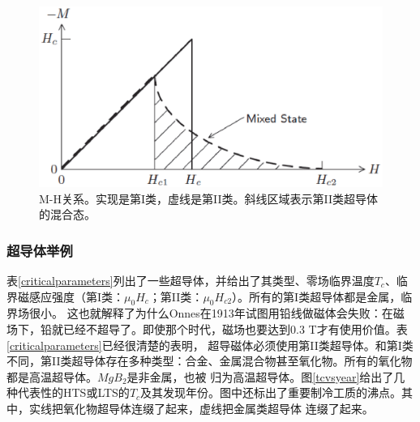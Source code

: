 \begin{figure}
  \centering
 \includegraphics[scale=0.6]{chpt1/figs/fig1.3.eps}
  \caption{
M-H关系。实现是第I类，虚线是第II类。斜线区域表示第II类超导体的混合态。
}\label{mhcurve}
\end{figure}

\subsubsection{超导体举例}
表\ref{criticalparameters}列出了一些超导体，并给出了其类型、零场临界温度$T_c$、临界磁感应强度（第I类：$\mu_0H_c$；第II类：$\mu_0H_{c2}$）。所有的第I类超导体都是金属，临界场很小。
这也就解释了为什么Onnes在1913年试图用铅线做磁体会失败：在磁场下，铅就已经不超导了。即使那个时代，磁场也要达到0.3 T才有使用价值。表\ref{criticalparameters}已经很清楚的表明，
超导磁体必须使用第II类超导体。和第I类不同，第II类超导体存在多种类型：合金、金属混合物甚至氧化物。所有的氧化物都是高温超导体。$MgB_2$是非金属，也被
归为高温超导体。图\ref{tcvsyear}给出了几种代表性的HTS或LTS的$T_c$及其发现年份。图中还标出了重要制冷工质的沸点。其中，实线把氧化物超导体连缀了起来，虚线把金属类超导体
连缀了起来。

